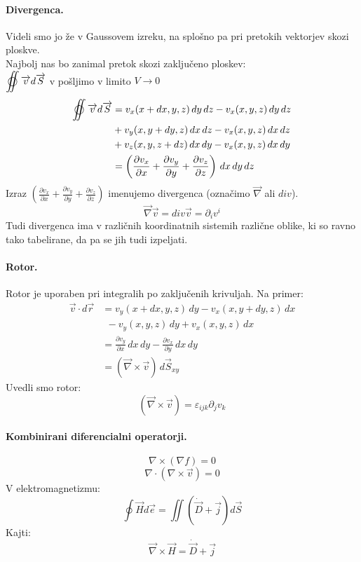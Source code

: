 \documentclass[a4paper]{article}
\newcommand{\vct}[1]{\overrightarrow{#1}}
\newcommand{\pd}[2]{\frac{\partial {#1}}{\partial {#2}}}
\begin{document}
\paragraph{Divergenca.} Videli smo jo že v Gaussovem izreku, na splošno pa pri pretokih vektorjev skozi ploskve. \\
Najbolj nas bo zanimal pretok skozi zaključeno ploskev: \\
$\displaystyle{\varoiint \vct{v}d\vct{S}}$ v pošljimo v limito $V \to 0$
\begin{align*}
    \varoiint \vct{v} d\vct{S} & = v_x(x + dx, y, z)\,dy\,dz - v_x(x, y, z)\,dy\,dz \\
    & + v_y(x, y + dy, z)\,dx\,dz - v_x(x, y, z)\,dx\,dz \\
    & + v_z(x, y, z + dz)\,dx\,dy - v_x(x, y, z)\,dx\,dy \\
    & = \left(\pd{v_x}{x} + \pd{v_y}{y} + \pd{v_z}{z}\right)\,dx\,dy\,dz
\end{align*}
Izraz $\displaystyle{\left(\pd{v_x}{x} + \pd{v_y}{y} + \pd{v_z}{z}\right)}$ imenujemo divergenca (označimo $\vct{\nabla}$ ali $div$).
$$\vct{\nabla} \vct{v} = div\vct{v} = \partial_iv^i$$
Tudi divergenca ima v različnih koordinatnih sistemih različne oblike, ki so ravno tako tabelirane,
da pa se jih tudi izpeljati.
\paragraph{Rotor.} Rotor je uporaben pri integralih po zaključenih krivuljah. Na primer:
\begin{align*}
    \vct{v} \cdot d\vct{r} & = v_y(x + dx, y, z)\,dy - v_x(x, y+dy, z)\,dx \\
    & ~~- v_y(x, y, z)\,dy + v_x(x, y, z)\,dx \\
    & = \pd{v_y}{x}\,dx\,dy - \pd{v_x}{y}\,dx\,dy \\
    & = (\vct{\nabla} \times \vct{v})\,d\vct{S}_{xy}
\end{align*}
Uvedli smo rotor:
$$(\vct\nabla \times \vct v) = \varepsilon_{ijk}\partial_jv_k$$
\paragraph{Kombinirani diferencialni operatorji.}
$$\nabla \times (\nabla f) = 0$$
$$\nabla \cdot (\nabla \times \vct v) = 0$$
V elektromagnetizmu:
$$\oint \vct H d \vct e = \iint \left(\dot{\vct D} + \vct j\right)d\vct S$$
Kajti: $$\vct\nabla\times\vct H = \dot{\vct{D}} + \vct{j}$$
\end{document}
